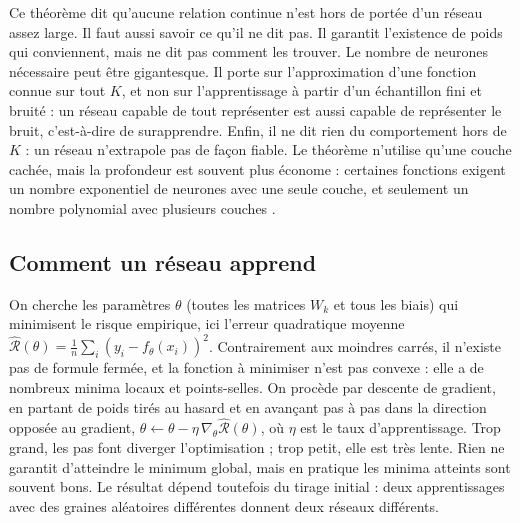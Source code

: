 \documentclass[11pt,a4paper]{article}
\begin{document}
Ce théorème dit qu'aucune relation continue n'est hors de portée d'un réseau assez large. Il faut aussi savoir ce
qu'il ne dit pas. Il garantit l'existence de poids qui conviennent, mais ne dit pas comment les trouver. Le nombre de
neurones nécessaire peut être gigantesque. Il porte sur l'approximation d'une fonction connue sur tout $K$, et non sur
l'apprentissage à partir d'un échantillon fini et bruité : un réseau capable de tout représenter est aussi capable de
représenter le bruit, c'est-à-dire de surapprendre. Enfin, il ne dit rien du comportement hors de $K$ : un réseau
n'extrapole pas de façon fiable. Le théorème n'utilise qu'une couche cachée, mais la profondeur est souvent plus
économe : certaines fonctions exigent un nombre exponentiel de neurones avec une seule couche, et seulement un nombre
polynomial avec plusieurs couches \citep{telgarsky2016}.

\subsection{Comment un réseau apprend}\label{sec:retropropagation}

On cherche les paramètres $\theta$ (toutes les matrices $W_k$ et tous les biais) qui minimisent le risque empirique,
ici l'erreur quadratique moyenne $\hat{\mathcal R}(\theta) = \frac1n\sum_i (y_i - f_\theta(x_i))^2$. Contrairement aux
moindres carrés, il n'existe pas de formule fermée, et la fonction à minimiser n'est pas convexe : elle a de nombreux
minima locaux et points-selles. On procède par descente de gradient, en partant de poids tirés au hasard et en
avançant pas à pas dans la direction opposée au gradient, $\theta \leftarrow \theta - \eta\,\nabla_\theta
\hat{\mathcal R}(\theta)$, où $\eta$ est le taux d'apprentissage. Trop grand, les pas font diverger l'optimisation ;
trop petit, elle est très lente. Rien ne garantit d'atteindre le minimum global, mais en pratique les minima atteints
sont souvent bons. Le résultat dépend toutefois du tirage initial : deux apprentissages avec des graines aléatoires
différentes donnent deux réseaux différents.
\end{document}
